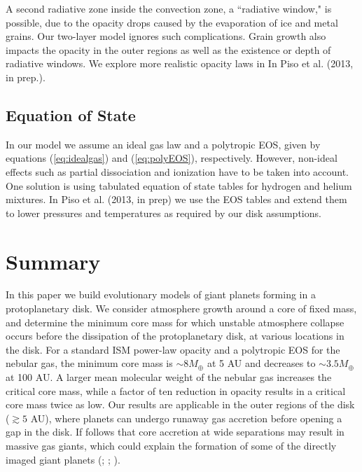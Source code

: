 \documentclass[apj, numberedappendix]{emulateapj}
\begin{document}
A second radiative zone inside the convection zone, a ``radiative window," is possible, due to the opacity drops caused by the evaporation of ice and metal grains. Our two-layer model ignores such complications. Grain growth also impacts the opacity in the outer regions as well as the existence or depth of radiative windows. We explore more realistic opacity laws in  In Piso et al. (2013, in prep.).



 \subsection{Equation of State}
 \label{sec:EOS}
 
 In our model we assume an ideal gas law and a polytropic EOS, given by equations (\ref{eq:idealgas}) and (\ref{eq:polyEOS}), respectively. However, non-ideal effects such as partial dissociation and ionization have to be taken into account. One solution is using tabulated equation of state tables for hydrogen and helium mixtures. In Piso et al. (2013, in prep) we use the \citet{saumon95} EOS tables and extend them to lower pressures and temperatures as required by our disk assumptions.



\section{Summary} \label{sec:conclusions}


In this paper we build evolutionary models of giant planets forming in a protoplanetary disk. We consider atmosphere growth around a core of fixed mass, and determine the minimum core mass for which unstable atmosphere collapse occurs before the dissipation of the protoplanetary disk, at various locations in the disk. For a standard ISM power-law opacity and a polytropic EOS for the nebular gas, the minimum core mass is $\sim 8 M_{\oplus}$ at 5 AU and decreases to $\sim 3.5 M_{\oplus}$ at 100 AU. A larger mean molecular weight of the nebular gas increases the critical core mass, while a factor of ten reduction in opacity results in a critical core mass twice as low.  Our results are applicable in the outer regions of the disk ($\gtrsim 5$ AU), where planets can undergo runaway gas accretion before opening a gap in the disk. If follows that core accretion at wide separations may result in massive gas giants, which could explain the formation of some of the directly imaged giant planets (\citealt{marois08}; \citealt{kalas08}; \citealt{lagrange10}).
\end{document}

